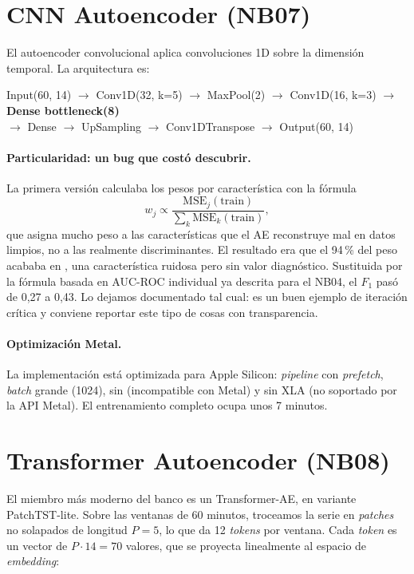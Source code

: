 \section{CNN Autoencoder (NB07)}
\label{sec:nb07}

El autoencoder convolucional aplica convoluciones 1D sobre la dimensión temporal. La arquitectura es:

\begin{center}
\textsf{Input(60, 14)} $\to$ Conv1D(32, k=5) $\to$ MaxPool(2) $\to$ Conv1D(16, k=3) $\to$ \textbf{Dense bottleneck(8)} \\
$\to$ Dense $\to$ UpSampling $\to$ Conv1DTranspose $\to$ Output(60, 14)
\end{center}

\paragraph{Particularidad: un bug que costó descubrir.} La primera versión calculaba los pesos por característica con la fórmula
\begin{equation*}
w_j \propto \frac{\mathrm{MSE}_j(\text{train})}{\sum_k \mathrm{MSE}_k(\text{train})},
\end{equation*}
que asigna mucho peso a las características que el AE reconstruye mal en datos limpios, no a las realmente discriminantes. El resultado era que el 94\,\% del peso acababa en , una característica ruidosa pero sin valor diagnóstico. Sustituida por la fórmula basada en AUC-ROC individual ya descrita para el NB04, el $F_1$ pasó de 0{,}27 a 0{,}43. Lo dejamos documentado tal cual: es un buen ejemplo de iteración crítica y conviene reportar este tipo de cosas con transparencia.

\paragraph{Optimización Metal.} La implementación está optimizada para Apple Silicon: \emph{pipeline}  con \emph{prefetch}, \emph{batch} grande (1024), sin  (incompatible con Metal) y sin XLA (no soportado por la API Metal). El entrenamiento completo ocupa unos 7 minutos.

\section{Transformer Autoencoder (NB08)}
\label{sec:nb08}

El miembro más moderno del banco es un Transformer-AE, en variante PatchTST-lite. Sobre las ventanas de 60 minutos, troceamos la serie en \textit{patches} no solapados de longitud $P=5$, lo que da 12 \textit{tokens} por ventana. Cada \textit{token} es un vector de $P \cdot 14 = 70$ valores, que se proyecta linealmente al espacio de \textit{embedding}:

